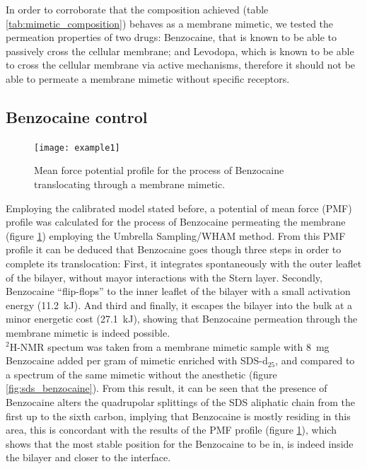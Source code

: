 \documentclass[9pt]{article}
\begin{document}
In order to corroborate that the composition achieved (table
\ref{tab:mimetic_composition}) behaves as a membrane mimetic, we tested the
permeation properties of two drugs: Benzocaine, that is known to be able to passively
cross the cellular membrane; and Levodopa, which is known to be able to cross the
cellular membrane via active mechanisms, therefore it should not be able to
permeate a membrane mimetic without specific receptors.

\subsection{Benzocaine control}
\label{sec:benzo}

\begin{figure}[h]
\centering
  \texttt{[image: example1]}
  \caption{Mean force potential profile for the process of Benzocaine
    translocating through a membrane mimetic.}
  \label{fig:benzocaine_profile}
\end{figure}
Employing the calibrated model stated before, a potential of mean force (PMF)
profile was calculated for the process of Benzocaine permeating the membrane
(figure \ref{fig:benzocaine_profile}) employing the Umbrella
Sampling/WHAM method. From this PMF profile it can be
deduced that Benzocaine goes though three steps in order to complete its
translocation: First, it integrates spontaneously with the outer leaflet of the
bilayer, without mayor interactions with the Stern layer. Secondly, Benzocaine
``flip-flops'' to the inner leaflet of the bilayer with a small activation
energy (\SI{11.2}{\kilo\joule}). And third and finally, it escapes the bilayer
into the
bulk at a minor energetic cost (\SI{27.1}{kJ}), showing that Benzocaine
permeation through the membrane mimetic is indeed possible.\\
$^2$H-NMR spectum was taken from a membrane mimetic sample with \SI{8}{mg}
Benzocaine added per gram of mimetic enriched with SDS-d$_{25}$, and compared to
a spectrum of the same mimetic without the anesthetic (figure
\ref{fig:sds_benzocaine}). From this result, it can be seen that the presence of
Benzocaine alters the quadrupolar splittings of the SDS aliphatic chain from the
first up to the sixth carbon, implying that Benzocaine is mostly residing in
this area, this is concordant with the results of the PMF profile (figure
\ref{fig:benzocaine_profile}), which shows that the most stable position for the
Benzocaine to be in, is indeed inside the bilayer and closer to the interface.
\end{document}
